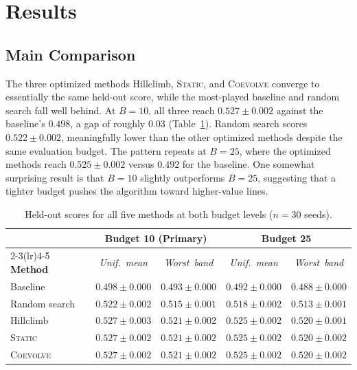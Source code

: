 \documentclass[conference]{IEEEtran}
\begin{document}
\section{Results}

\subsection{Main Comparison}

The three optimized methods Hillclimb, \textsc{Static}, and
\textsc{Coevolve} converge to essentially the same held-out score, while
the most-played baseline and random search fall well behind. At $B = 10$,
all three reach $0.527 \pm 0.002$ against the baseline's $0.498$, a gap
of roughly 0.03 (Table~\ref{tab:main}). Random search scores
$0.522 \pm 0.002$, meaningfully lower than the other optimized methods
despite the same evaluation budget. The pattern repeats at $B = 25$, where
the optimized methods reach $0.525 \pm 0.002$ versus $0.492$ for the
baseline. One somewhat surprising result is that $B = 10$ slightly outperforms
$B = 25$, suggesting that a tighter budget pushes the algorithm toward
higher-value lines.

\begin{table}[!t]
  \centering
  \caption{Held-out scores for all five methods at both budget levels ($n=30$ seeds).}
  \label{tab:main}
  \renewcommand{\arraystretch}{1.15}
  \setlength{\tabcolsep}{6pt}
  \begin{tabular}{l cc cc}
    \toprule
    & \multicolumn{2}{c}{\textbf{Budget 10 (Primary)}}
    & \multicolumn{2}{c}{\textbf{Budget 25}} \\
    \cmidrule(lr){2-3}\cmidrule(lr){4-5}
    \textbf{Method} & \textit{Unif.~mean} & \textit{Worst~band}
                    & \textit{Unif.~mean} & \textit{Worst~band} \\
    \midrule
    Baseline        & $0.498 \pm 0.000$ & $0.493 \pm 0.000$
                    & $0.492 \pm 0.000$ & $0.488 \pm 0.000$ \\
    Random search   & $0.522 \pm 0.002$ & $0.515 \pm 0.001$
                    & $0.518 \pm 0.002$ & $0.513 \pm 0.001$ \\
    Hillclimb       & $0.527 \pm 0.003$ & $0.521 \pm 0.002$
                    & $0.525 \pm 0.002$ & $0.520 \pm 0.001$ \\
    \textsc{Static} & $0.527 \pm 0.002$ & $0.521 \pm 0.002$
                    & $0.525 \pm 0.002$ & $0.520 \pm 0.002$ \\
    \textsc{Coevolve} & $0.527 \pm 0.002$ & $0.521 \pm 0.002$
                      & $0.525 \pm 0.002$ & $0.520 \pm 0.002$ \\
    \bottomrule
  \end{tabular}
\end{table}
\end{document}
